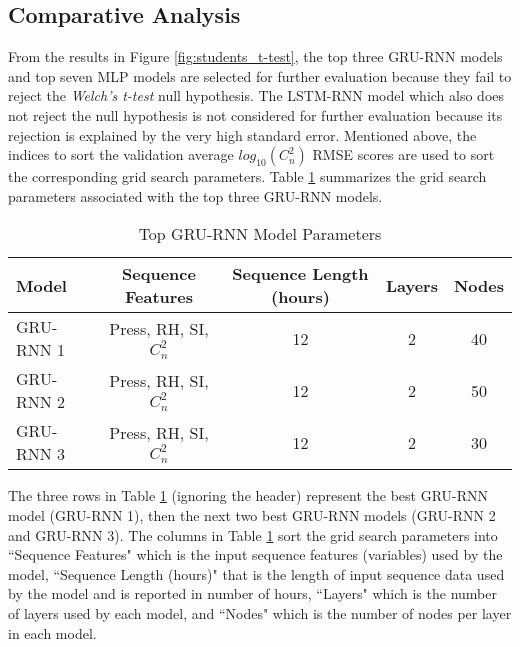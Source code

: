 \subsection{Comparative Analysis}
From the results in Figure \ref{fig:students_t-test}, the top three \ac{GRU-RNN} models and top seven \ac{MLP} models are selected for further evaluation because they fail to reject the \textit{Welch's t-test} null hypothesis. The \ac{LSTM-RNN} model which also does not reject the null hypothesis is not considered for further evaluation because its rejection is explained by the very high standard error. Mentioned above, the indices to sort the validation average $log_{10}(C_{n}^{2})$ RMSE scores are used to sort the corresponding grid search parameters. Table \ref{tab:grid_search_results_GRU} summarizes the grid search parameters associated with the top three \ac{GRU-RNN} models.
\begin{table}[h!]
	\begin{center}
		\caption{Top GRU-RNN Model Parameters}
		\label{tab:grid_search_results_GRU}
		\begin{tabular}{||l|c|c|c|c||}
			\hline
			Model & Sequence Features & Sequence Length (hours) & Layers & Nodes \\
			\hline
			\hline
			GRU-RNN 1 & Press, RH, SI, $C_{n}^{2}$ & 12 & 2 & 40 \\
			\hline
			GRU-RNN 2 & Press, RH, SI, $C_{n}^{2}$ & 12 & 2 & 50 \\
			\hline
			GRU-RNN 3 & Press, RH, SI, $C_{n}^{2}$ & 12 & 2 & 30 \\
			\hline
		\end{tabular}
	\end{center}
\end{table}
The three rows in Table \ref{tab:grid_search_results_GRU} (ignoring the header) represent the best \ac{GRU-RNN} model (\ac{GRU-RNN} 1), then the next two best \ac{GRU-RNN} models (\ac{GRU-RNN} 2 and \ac{GRU-RNN} 3). The columns in Table \ref{tab:grid_search_results_GRU} sort the grid search parameters into ``Sequence Features" which is the input sequence features (variables) used by the model, ``Sequence Length (hours)" that is the length of input sequence data used by the model and is reported in number of hours, ``Layers" which is the number of layers used by each model, and ``Nodes" which is the number of nodes per layer in each model.

